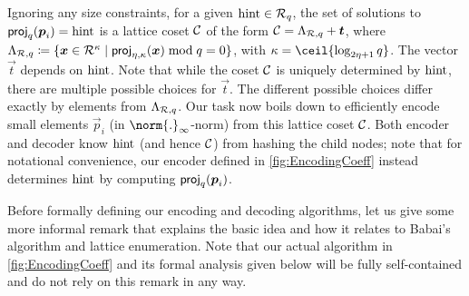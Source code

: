Ignoring any size constraints, for a given $\mathrm{hint}\in\mathcal{R}_q$, the set of solutions to $\mathsf{proj}_{q}(\boldsymbol{p}_i) = \mathrm{hint}$ is a lattice coset $\mathcal{C}$ of the form $\mathcal{C} = \Lambda_{\mathcal{R},q} + \boldsymbol{t}$, where $\Lambda_{\mathcal{R},q} \coloneqq \{\boldsymbol{x}\in\mathcal{R}^\kappa \mid \mathsf{proj}_{\eta,\kappa}(\boldsymbol{x})\bmod q = 0\}$, with $\limbs = \ceil{\log_{2\eta+1}q}$. The vector $\vec{t}$ depends on $\mathrm{hint}$.
Note that while the coset $\mathcal{C}$ is uniquely determined by $\mathrm{hint}$, there are multiple possible choices for $\vec{t}$. The different possible choices differ exactly by elements from $\Lambda_{\mathcal{R},q}$.
Our task now boils down to efficiently encode small elements $\vec{p}_{i}$ (in $\norm{.}_{\infty}$-norm) from this lattice coset $\mathcal{C}$. Both encoder and decoder know $\mathrm{hint}$ (and hence $\mathcal{C}$) from hashing the child nodes; note that for notational convenience, our encoder defined in \autoref{fig:EncodingCoeff} instead determines $\mathrm{hint}$ by computing $\mathsf{proj}_{q}(\boldsymbol{p}_i)$.

\medskip
Before formally defining our encoding and decoding algorithms, let us give some more informal remark that explains the basic idea and how it relates to Babai's algorithm and lattice enumeration. Note that our actual algorithm in \autoref{fig:EncodingCoeff} and its formal analysis given below will be fully self-contained and do not rely on this remark in any way.


